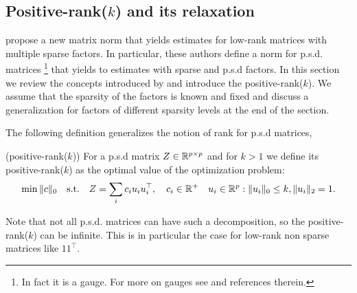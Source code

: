  


%


\subsection{Positive-rank($k$) and its relaxation}
\label{subsec:norm}

\citet{richard2014tight} propose a new matrix norm that yields estimates for low-rank matrices with multiple sparse factors. In particular, these authors define a norm for p.s.d. matrices \footnote{In fact it is a gauge. For more on gauges see \citet{chandrasekaran2010convex} and references therein.}  that yields to estimates with sparse and p.s.d factors. In this section we review the concepts introduced by \citet{richard2014tight} and introduce the positive-rank($k$). We assume that the sparsity of the factors is known and fixed and discuss a generalization for factors of different sparsity levels at the end of the section.

The following definition generalizes the notion of rank for p.s.d matrices,
\begin{mydef}
(positive-rank($k$)) For a p.s.d  matrix $Z\in\mathbb{R}^{p\times p}$ and for $k>1$ we define its positive-rank($k$) as the optimal
value of the optimization problem:
\begin{align}
\min \|c\|_0 \quad \text{s.t.} \quad Z=\sum_{i} c_i u_i u_{i}^\top, \quad c_i\in \mathbb{R}^{+} \quad u_{i}\in\mathbb{R}^p  :   \|u_{i}\|_0 \leq k, \|u_{i}\|_2 = 1.
\end{align}
\end{mydef}
Note that not all p.s.d. matrices can have such a decomposition, so the positive-rank($k$) can be infinite. This is in particular the case for low-rank non sparse matrices like $11^{\top}$. 

